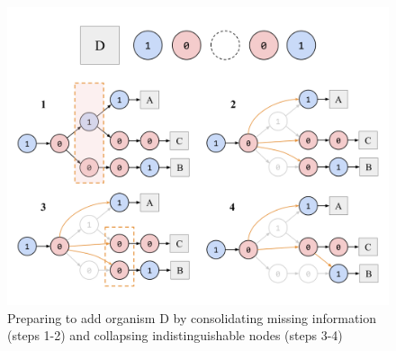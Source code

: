 \begin{figure}[h]
\centering
\includegraphics[width=\linewidth]{img/algo-diagram.png}
\caption{Preparing to add organism D by consolidating missing information (steps 1-2) and collapsing indistinguishable nodes (steps 3-4)}
\label{fig:algo-diagram}
\end{figure}